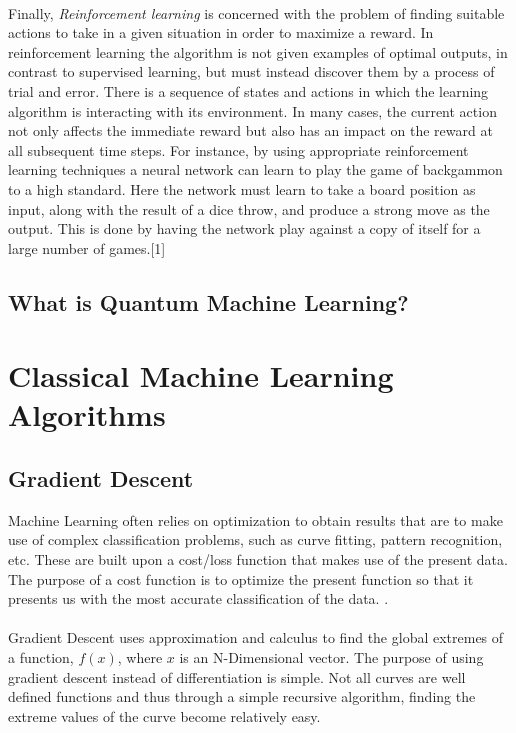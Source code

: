 \documentclass[hidelinks,12pt]{article}
\begin{document}
	\paragraph{}
	Finally, \textit{Reinforcement learning} is concerned with the problem of finding suitable actions to take in a given situation in order to maximize a reward. In reinforcement learning the algorithm is not given examples of optimal outputs, in contrast to supervised learning, but must instead discover them by a process of trial and error. There is a sequence of states and actions in which the learning algorithm is interacting with its environment. In many cases, the current action not only affects the immediate reward but also has an impact on the reward at all subsequent time steps. For instance, by using appropriate reinforcement learning techniques a neural network can learn to play the game of backgammon to a high standard. Here the network must learn to take a board position as input, along with the result of a dice throw, and produce a strong move as the output. This is done by having the network play against a copy of itself for a large number of games.[1]

\subsection{What is Quantum Machine Learning?}

\newpage
\section{Classical Machine Learning Algorithms}
\subsection{Gradient Descent}

	Machine Learning often relies on optimization to obtain results that are to make use of complex classification problems, such as curve fitting, pattern recognition, etc. These are built upon a cost/loss function that makes use of the present data. The purpose of a cost function is to optimize the present function so that it presents us with the most accurate classification of the data. .
	\paragraph{}
	Gradient Descent uses approximation and calculus to find the global extremes of a function, $f(x)$, where $x$ is an N-Dimensional vector. The purpose of using gradient descent instead of differentiation is simple. Not all curves are well defined functions and thus through a simple recursive algorithm, finding the extreme values of the curve become relatively easy. 
\end{document}
